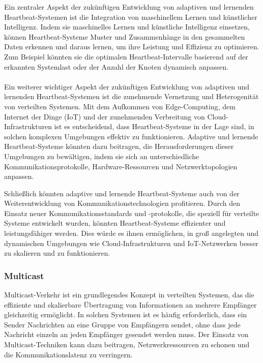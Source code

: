 \documentclass[../vs-script-first-v01.tex]{subfiles}
\begin{document}
Ein zentraler Aspekt der zukünftigen Entwicklung von adaptiven und lernenden Heartbeat-Systemen ist die Integration von maschinellem Lernen und künstlicher Intelligenz. Indem sie maschinelles Lernen und künstliche Intelligenz einsetzen, können Heartbeat-Systeme Muster und Zusammenhänge in den gesammelten Daten erkennen und daraus lernen, um ihre Leistung und Effizienz zu optimieren. Zum Beispiel könnten sie die optimalen Heartbeat-Intervalle basierend auf der erkannten Systemlast oder der Anzahl der Knoten dynamisch anpassen.
\\\\
Ein weiterer wichtiger Aspekt der zukünftigen Entwicklung von adaptiven und lernenden Heartbeat-Systemen ist die zunehmende Vernetzung und Heterogenität von verteilten Systemen. Mit dem Aufkommen von Edge-Computing, dem Internet der Dinge (IoT) und der zunehmenden Verbreitung von Cloud-Infrastrukturen ist es entscheidend, dass Heartbeat-Systeme in der Lage sind, in solchen komplexen Umgebungen effektiv zu funktionieren. Adaptive und lernende Heartbeat-Systeme könnten dazu beitragen, die Herausforderungen dieser Umgebungen zu bewältigen, indem sie sich an unterschiedliche Kommunikationsprotokolle, Hardware-Ressourcen und Netzwerktopologien anpassen.

Schließlich könnten adaptive und lernende Heartbeat-Systeme auch von der Weiterentwicklung von Kommunikationstechnologien profitieren. Durch den Einsatz neuer Kommunikationsstandards und -protokolle, die speziell für verteilte Systeme entwickelt wurden, könnten Heartbeat-Systeme effizienter und leistungsfähiger werden. Dies würde es ihnen ermöglichen, in groß angelegten und dynamischen Umgebungen wie Cloud-Infrastrukturen und IoT-Netzwerken besser zu skalieren und zu funktionieren.

\subsubsection{Multicast}

Multicast-Verkehr ist ein grundlegendes Konzept in verteilten Systemen, das die effiziente und skalierbare Übertragung von Informationen an mehrere Empfänger gleichzeitig ermöglicht. In solchen Systemen ist es häufig erforderlich, dass ein Sender Nachrichten an eine Gruppe von Empfängern sendet, ohne dass jede Nachricht einzeln an jeden Empfänger gesendet werden muss. Der Einsatz von Multicast-Techniken kann dazu beitragen, Netzwerkressourcen zu schonen und die Kommunikationslatenz zu verringern.
\end{document}
